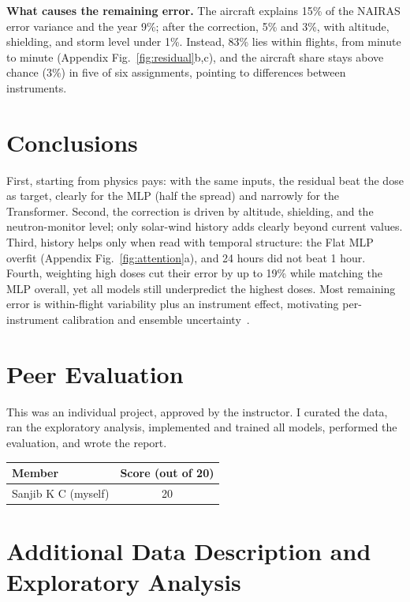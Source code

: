 \documentclass[10pt,twocolumn,letterpaper]{article}
\begin{document}
\textbf{What causes the remaining error.} The aircraft explains 15\% of the
NAIRAS error variance and the year 9\%; after the correction, 5\% and 3\%,
with altitude, shielding, and storm level under 1\%. Instead, 83\% lies
within flights, from minute to minute (Appendix Fig.~\ref{fig:residual}b,c),
and the aircraft share stays above chance (3\%) in five of six assignments,
pointing to differences between instruments.

\section{Conclusions}
\label{sec:conclusions}
First, starting from physics pays: with the same
inputs, the residual beat the dose as target, clearly for the MLP (half the
spread) and narrowly for the Transformer. Second, the correction is driven by altitude, shielding,
and the neutron-monitor level; only solar-wind history adds clearly
beyond current values. Third, history helps only when read with temporal
structure: the Flat MLP overfit (Appendix Fig.~\ref{fig:attention}a), and 24 hours
did not beat 1 hour. Fourth,
weighting high doses cut their error by up to 19\% while matching the MLP
overall, yet all models still underpredict the highest doses. Most remaining error is
within-flight variability plus an instrument effect, motivating
per-instrument calibration and ensemble uncertainty~\cite{lakshminarayanan2017}.

\clearpage
\section*{Peer Evaluation}
This was an individual project, approved by the instructor. I curated the
data, ran the exploratory analysis, implemented and trained all models,
performed the evaluation, and wrote the report.

\begin{center}\small
\begin{tabular}{lc}\toprule
Member & Score (out of 20) \\ \midrule
Sanjib K C (myself) & 20 \\ \bottomrule
\end{tabular}
\end{center}

{\small


}

\clearpage
\appendix
\section{Additional Data Description and Exploratory Analysis}
\label{app:eda}
\end{document}
